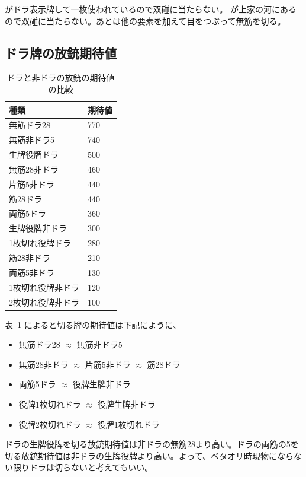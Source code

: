 \documentclass[../nankiru_main.tex]{subfiles}
\begin{document}
 がドラ表示牌して一枚使われているので双碰に当たらない。 が上家の河にあるので双碰に当たらない。あとは他の要素を加えて目をつぶって無筋を切る。

\subsection{ドラ牌の放銃期待値}

\begin{table}[ht]
  \centering
  \begin{tabular}{l|l}
    種類 & 期待値 \\
    \hline
    無筋ドラ28 & 770 \\
    無筋非ドラ5 & 740 \\
    生牌役牌ドラ & 500 \\
    無筋28非ドラ & 460 \\
    片筋5非ドラ & 440 \\
    筋28ドラ & 440 \\
    両筋5ドラ & 360 \\
    生牌役牌非ドラ & 300 \\
    1枚切れ役牌ドラ & 280 \\
    筋28非ドラ & 210 \\
    両筋5非ドラ & 130 \\
    1枚切れ役牌非ドラ & 120 \\
    2枚切れ役牌非ドラ & 100 \\
    \end{tabular}
  \caption{ドラと非ドラの放銃の期待値の比較\citep[][p. 181]{miinin-stat}}
  \label{tab:cut-dora}
\end{table}

表~\ref{tab:cut-dora} によると切る牌の期待値は下記にように、

\begin{itemize}
\item 無筋ドラ28 $\approx$ 無筋非ドラ5
\item 無筋28非ドラ $\approx$ 片筋5非ドラ $\approx$ 筋28ドラ
\item 両筋5ドラ $\approx$ 役牌生牌非ドラ
\item 役牌1枚切れドラ $\approx$ 役牌生牌非ドラ
\item 役牌2枚切れドラ $\approx$ 役牌1枚切れドラ
\end{itemize}

ドラの生牌役牌を切る放銃期待値は非ドラの無筋28より高い。ドラの両筋の5を切る放銃期待値は非ドラの生牌役牌より高い。よって、ベタオリ時現物にならない限りドラは切らないと考えてもいい\citep[][p. 182]{miinin-stat}。
\end{document}
